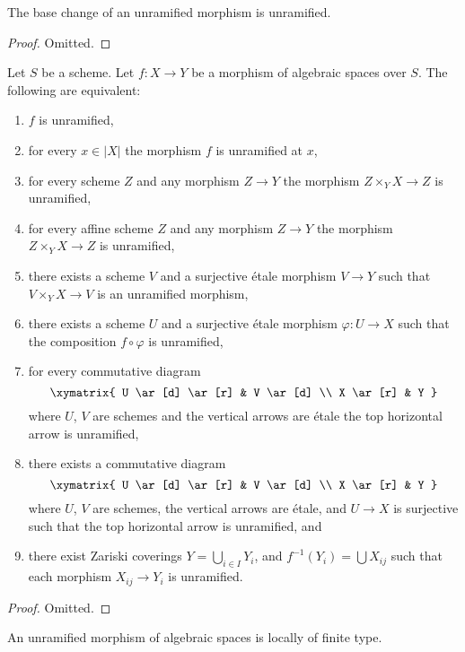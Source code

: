 \begin{lemma}
\label{lemma-base-change-unramified}
The base change of an unramified morphism is unramified.
\end{lemma}

\begin{proof}
Omitted.
\end{proof}

\begin{lemma}
\label{lemma-unramified-local}
Let $S$ be a scheme.
Let $f : X \to Y$ be a morphism of algebraic spaces over $S$.
The following are equivalent:
\begin{enumerate}
\item $f$ is unramified,
\item for every $x \in |X|$ the morphism $f$ is unramified at $x$,
\item for every scheme $Z$ and any morphism $Z \to Y$ the morphism
$Z \times_Y X \to Z$ is unramified,
\item for every affine scheme $Z$ and any morphism
$Z \to Y$ the morphism $Z \times_Y X \to Z$ is unramified,
\item there exists a scheme $V$ and a surjective \'etale morphism
$V \to Y$ such that $V \times_Y X \to V$ is an unramified morphism,
\item there exists a scheme $U$ and a surjective \'etale morphism
$\varphi : U \to X$ such that the composition $f \circ \varphi$
is unramified,
\item for every commutative diagram
$$
\xymatrix{
U \ar[d] \ar[r] & V \ar[d] \\
X \ar[r] & Y
}
$$
where $U$, $V$ are schemes and the vertical arrows are \'etale
the top horizontal arrow is unramified,
\item there exists a commutative diagram
$$
\xymatrix{
U \ar[d] \ar[r] & V \ar[d] \\
X \ar[r] & Y
}
$$
where $U$, $V$ are schemes, the vertical arrows are \'etale, and
$U \to X$ is surjective such that the top horizontal arrow is unramified, and
\item there exist Zariski coverings $Y = \bigcup_{i \in I} Y_i$,
and $f^{-1}(Y_i) = \bigcup X_{ij}$ such that
each morphism $X_{ij} \to Y_i$ is unramified.
\end{enumerate}
\end{lemma}

\begin{proof}
Omitted.
\end{proof}


\begin{lemma}
\label{lemma-unramified-locally-finite-type}
An unramified morphism of algebraic spaces is locally of finite type.
\end{lemma}


